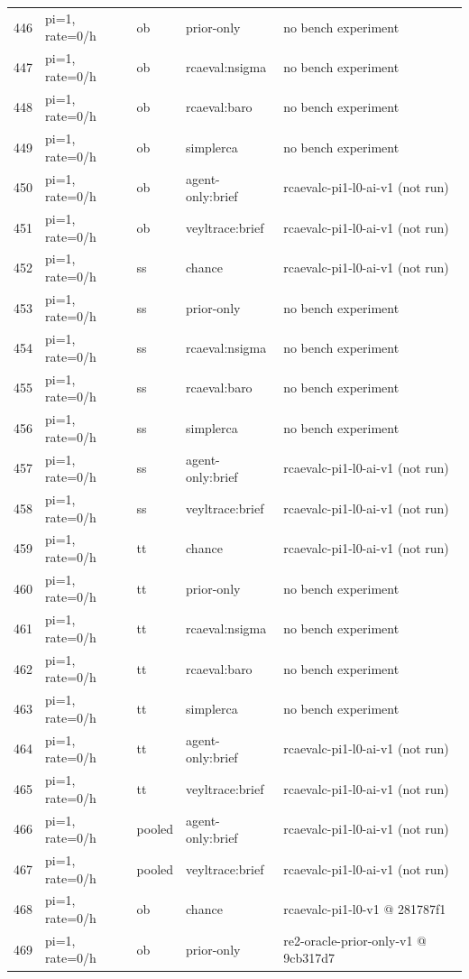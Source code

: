 \begin{longtable}{@{}r>{\raggedright\arraybackslash}p{48.0pt}>{\raggedright\arraybackslash}p{18.0pt}>{\raggedright\arraybackslash}p{108.0pt}>{\raggedright\arraybackslash}p{105.0pt}@{}}
446 & pi=1, rate=0/h & ob & prior-only & no bench experiment \\
447 & pi=1, rate=0/h & ob & rcaeval:nsigma & no bench experiment \\
448 & pi=1, rate=0/h & ob & rcaeval:baro & no bench experiment \\
449 & pi=1, rate=0/h & ob & simplerca & no bench experiment \\
450 & pi=1, rate=0/h & ob & agent-only:brief & rcaevalc-pi1-l0-ai-v1 (not run) \\
451 & pi=1, rate=0/h & ob & veyltrace:brief & rcaevalc-pi1-l0-ai-v1 (not run) \\
452 & pi=1, rate=0/h & ss & chance & rcaevalc-pi1-l0-ai-v1 (not run) \\
453 & pi=1, rate=0/h & ss & prior-only & no bench experiment \\
454 & pi=1, rate=0/h & ss & rcaeval:nsigma & no bench experiment \\
455 & pi=1, rate=0/h & ss & rcaeval:baro & no bench experiment \\
456 & pi=1, rate=0/h & ss & simplerca & no bench experiment \\
457 & pi=1, rate=0/h & ss & agent-only:brief & rcaevalc-pi1-l0-ai-v1 (not run) \\
458 & pi=1, rate=0/h & ss & veyltrace:brief & rcaevalc-pi1-l0-ai-v1 (not run) \\
459 & pi=1, rate=0/h & tt & chance & rcaevalc-pi1-l0-ai-v1 (not run) \\
460 & pi=1, rate=0/h & tt & prior-only & no bench experiment \\
461 & pi=1, rate=0/h & tt & rcaeval:nsigma & no bench experiment \\
462 & pi=1, rate=0/h & tt & rcaeval:baro & no bench experiment \\
463 & pi=1, rate=0/h & tt & simplerca & no bench experiment \\
464 & pi=1, rate=0/h & tt & agent-only:brief & rcaevalc-pi1-l0-ai-v1 (not run) \\
465 & pi=1, rate=0/h & tt & veyltrace:brief & rcaevalc-pi1-l0-ai-v1 (not run) \\
466 & pi=1, rate=0/h & pooled & agent-only:brief & rcaevalc-pi1-l0-ai-v1 (not run) \\
467 & pi=1, rate=0/h & pooled & veyltrace:brief & rcaevalc-pi1-l0-ai-v1 (not run) \\
468 & pi=1, rate=0/h & ob & chance & rcaevalc-pi1-l0-v1 @ 281787f1 \\
469 & pi=1, rate=0/h & ob & prior-only & re2-oracle-prior-only-v1 @ 9cb317d7 \\

\end{longtable}
